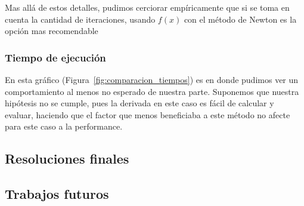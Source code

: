 Mas allá de estos detalles, pudimos cerciorar empíricamente que si se toma en cuenta la cantidad de iteraciones, usando $f(x)$ con el método de Newton es la opción mas recomendable


\subsubsection{Tiempo de ejecución} %
\label{ssub:tiempo_de_ejecuci_n}

En esta gráfico (Figura~\ref{fig:comparacion_tiempos}) es en donde pudimos ver un comportamiento al menos no esperado de nuestra parte. Suponemos que nuestra hipótesis no se cumple, pues la derivada en este caso es fácil de calcular y evaluar, haciendo que el factor que menos beneficiaba a este método no afecte para este caso a la performance.



\subsection{Resoluciones finales} %
\label{sub:resoluciones_finales}


\subsection{Trabajos futuros} %
\label{sub:trabajos_futuros}

